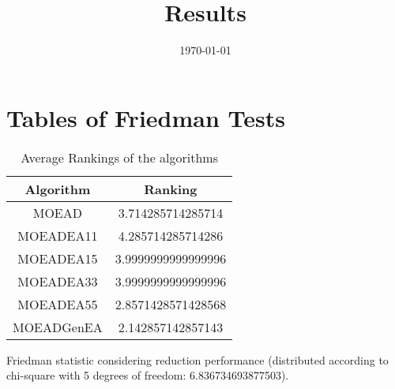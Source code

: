 \documentclass{article}
\title{Results}
\author{}
\date{\today}
\begin{document}
\oddsidemargin 0in \topmargin 0in\maketitle
\section{Tables of Friedman Tests}
\begin{table}[!htp]
\centering
\caption{Average Rankings of the algorithms
}\begin{tabular}{c|c}
Algorithm&Ranking\\
\hline
MOEAD&3.714285714285714\\
MOEADEA11&4.285714285714286\\
MOEADEA15&3.9999999999999996\\
MOEADEA33&3.9999999999999996\\
MOEADEA55&2.8571428571428568\\
MOEADGenEA&2.142857142857143\\
\end{tabular}
\end{table}


Friedman statistic considering reduction performance (distributed according to chi-square with 5 degrees of freedom: 6.836734693877503).
\end{document}
